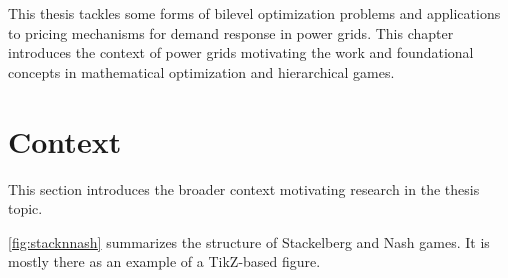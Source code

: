 
\label{chap:Introduction}

This thesis tackles some forms of bilevel optimization problems and applications
to pricing mechanisms for demand response in power grids.
This chapter introduces the context of power grids motivating the work
and foundational concepts in mathematical optimization and hierarchical games.

\section{Context}

This section introduces the broader context motivating research in the thesis topic.

\cref{fig:stacknnash} summarizes the structure of Stackelberg and Nash games.
It is mostly there as an example of a TikZ-based figure.

